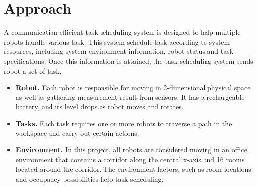 \chapter{Approach}


A communication efficient task scheduling system is designed to help multiple robots handle various task. 
This system schedule task according to system resources, including system environment information, robot status and task specifications. Once this information is attained, the task scheduling system sends robot a set of task.

\begin{itemize}
	\item \textbf{Robot.} Each robot is responsible for moving in 2-dimensional physical space as well as gathering measurement result from sensors. It has a rechargeable battery, and its level drops as robot moves and rotates.
	\item \textbf{Tasks.} Each task requires one or more robots to traverse a path in the workspace and carry out certain actions\cite{Ivan2017}.
	\item \textbf{Environment.} In this project, all robots are considered moving in an office environment that contains a corridor along the central x-axis and 16 rooms located around the corridor. The environment factors, such as room locations and occupancy possibilities help task scheduling.
\end{itemize}

